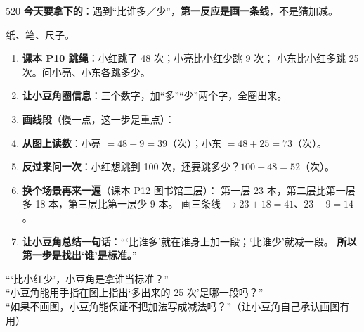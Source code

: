 \begin{lesson}{5}{20}
\textbf{今天要拿下的}：遇到“比谁多／少”，\textbf{第一反应是画一条线}，不是猜加减。

\begin{materials}
纸、笔、尺子。
\end{materials}

\begin{enumerate}
  \item \textbf{课本 P10 跳绳}：小红跳了 48 次；小亮比小红少跳 9 次；
        小东比小红多跳 25 次。问小亮、小东各跳多少。
  \item \textbf{让小豆角圈信息}：三个数字，加“多”“少”两个字，全圈出来。
  \item \textbf{画线段}（慢一点，这一步是重点）：
        \begin{center}
        \end{center}
  \item \textbf{从图上读数}：小亮 $=48-9=39$（次）；小东 $=48+25=73$（次）。
  \item \textbf{反过来问一次}：小红想跳到 100 次，还要跳多少？$100-48=52$（次）。
  \item \textbf{换个场景再来一遍}（课本 P12 图书馆三层）：
        第一层 23 本，第二层比第一层多 18 本，第三层比第一层少 9 本。
        画三条线 $\to 23+18=41$、$23-9=14$。
  \item \textbf{让小豆角总结一句话}：“‘比谁多’就在谁身上加一段；‘比谁少’就减一段。
        \textbf{所以第一步是找出‘谁’是标准。}”
\end{enumerate}

\begin{saybox}
“‘比小红少’，小豆角是拿谁当标准？”\\
“小豆角能用手指在图上指出‘多出来的 25 次’是哪一段吗？”\\
“如果不画图，小豆角能保证不把加法写成减法吗？”（让小豆角自己承认画图有用）
\end{saybox}


\end{lesson}
